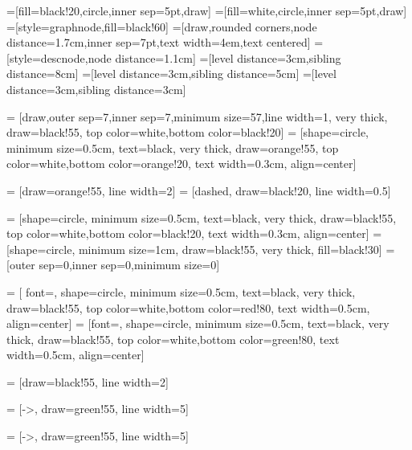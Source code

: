 \documentclass[10pt
,a4paper,
parskip]
{scrbook}
\begin{document}
=[fill=black!20,circle,inner sep=5pt,draw]
=[fill=white,circle,inner sep=5pt,draw]
=[style=graphnode,fill=black!60]
=[draw,rounded corners,node distance=1.7cm,inner sep=7pt,text width=4em,text centered]
=[style=descnode,node distance=1.1cm]
=[level distance=3cm,sibling distance=8cm]
=[level distance=3cm,sibling distance=5cm]
=[level distance=3cm,sibling distance=3cm]
  

 = [draw,outer sep=7,inner sep=7,minimum size=57,line width=1, very thick, draw=black!55, top color=white,bottom color=black!20]
 = [shape=circle, minimum size=0.5cm,  text=black, very thick, draw=orange!55, top color=white,bottom color=orange!20, text width=0.3cm, align=center]


 = [draw=orange!55, line width=2]
 = [dashed, draw=black!20, line width=0.5]



 = [shape=circle, minimum size=0.5cm, text=black, very thick, draw=black!55, top color=white,bottom color=black!20, text width=0.3cm, align=center]
 = [shape=circle, minimum size=1cm, draw=black!55, very thick, fill=black!30]
 = [outer sep=0,inner sep=0,minimum size=0]

 = [  font={\huge\bfseries}, shape=circle, minimum size=0.5cm, text=black, very thick, draw=black!55, top color=white,bottom color=red!80, text width=0.5cm, align=center]
 = [font={\huge\bfseries}, shape=circle, minimum size=0.5cm, text=black, very thick, draw=black!55, top color=white,bottom color=green!80, text width=0.5cm, align=center]

 = [draw=black!55, line width=2]

 = [->, draw=green!55, line width=5]

 = [->, draw=green!55, line width=5]
\end{document}
